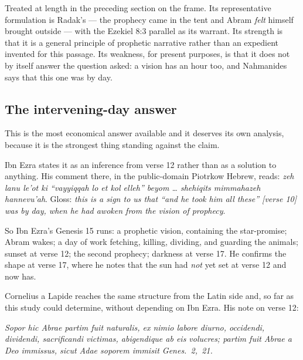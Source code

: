 Treated at length in the preceding section on the frame. Its representative
formulation is Radak's --- the prophecy came in the tent and Abram \emph{felt}
himself brought outside --- with the Ezekiel 8:3 parallel as its warrant. Its
strength is that it is a general principle of prophetic narrative rather than an
expedient invented for this passage. Its weakness, for present purposes, is
that it does not by itself answer the question asked: a vision has an hour too,
and Nahmanides says that this one was by day.

\subsection{The intervening-day answer}

This is the most economical answer available and it deserves its own analysis,
because it is the strongest thing standing against the claim.

Ibn Ezra states it as an inference from verse 12 rather than as a solution to
anything. His comment there, in the public-domain Piotrkow Hebrew, reads:
\textit{zeh lanu le'ot ki ``vayyiqqah lo et kol elleh'' beyom \dots{} shehiqits
mimmahazeh hannevu'ah}. Gloss: \emph{this is a sign to us that ``and he took him
all these'' [verse 10] was by day, when he had awoken from the vision of
prophecy}.

So Ibn Ezra's Genesis 15 runs: a prophetic vision, containing the star-promise;
Abram wakes; a day of work fetching, killing, dividing, and guarding the
animals; sunset at verse 12; the second prophecy; darkness at verse 17. He
confirms the shape at verse 17, where he notes that the sun had \emph{not} yet
set at verse 12 and now has.

Cornelius a Lapide reaches the same structure from the Latin side and, so far
as this study could determine, without depending on Ibn Ezra. His note on verse
12:

\begin{studyframe}
\textit{Sopor hic Abrae partim fuit naturalis, ex nimio labore diurno, occidendi,
dividendi, sacrificandi victimas, abigendique ab eis volucres; partim fuit Abrae
a Deo immissus, sicut Adae soporem immisit Genes.\ 2,~21.}
\end{studyframe}

